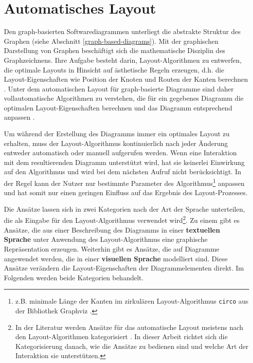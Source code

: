 


\section{Automatisches Layout}
\label{sec:automatic-layout}

Den graph-basierten Softwarediagrammen unterliegt die abstrakte Struktur des Graphen (siehe Abschnitt \ref{graph-based-diagrams}). Mit der graphischen Darstellung von Graphen beschäftigt sich die mathematische Disziplin des Graphzeichnens. Ihre Aufgabe besteht darin, Layout-Algorithmen zu entwerfen, die optimale Layouts in Hinsicht auf ästhetische Regeln erzeugen, d.h. die Layout-Eigenschaften wie Position der Knoten und Routen der Kanten berechnen \cite{Eichelberger05Aesthetics, Arvo02Techniques, Siebenhaller03Automatisches, Maier12A-Pattern-based}. Unter dem automatischen Layout für graph-basierte Diagramme sind daher vollautomatische Algorithmen zu verstehen, die für ein gegebenes Diagramm die optimalen Layout-Eigenschaften berechnen und das Diagramm entsprechend anpassen \cite{Fuhrmann11On-the-Pragmatics}.

Um während der Erstellung des Diagramms immer ein optimales Layout zu erhalten, muss der Layout-Algorithmus kontinuierlich nach jeder Änderung entweder automatisch oder manuell aufgerufen werden. Wenn eine Interaktion mit dem resultierenden Diagramm unterstützt wird, hat sie keinerlei Einwirkung auf den Algorithmus und wird bei dem nächsten Aufruf nicht berücksichtigt. In der Regel kann der Nutzer nur bestimmte Parameter des Algorithmus\footnote{z.B. minimale Länge der Kanten im zirkulären Layout-Algorithmus \lstinline{circo} aus der Bibliothek Graphviz \cite{NorthGansner14Dot-Manual}.} anpassen und hat somit nur einen geringen Einfluss auf das Ergebnis des Layout-Prozesses.

Die Ansätze lassen sich in zwei Kategorien nach der Art der Sprache unterteilen, die als Eingabe für den Layout-Algorithmus verwendet wird\footnote{In der Literatur werden Ansätze für das automatische Layout meistens nach den Layout-Algorithmen kategorisiert \cite[S.39ff]{Fuhrmann11On-the-Pragmatics} \cite[S.32ff]{Eichelberger05Aesthetics}. In dieser Arbeit richtet sich die Kategorisierung danach, wie die Ansätze zu bedienen sind und welche Art der Interaktion sie unterstützen.}. Zu einem gibt es Ansätze, die aus einer Beschreibung des Diagramms in einer \textbf{textuellen Sprache} unter Anwendung des Layout-Algorithmus eine graphische Repräsentation erzeugen. Weiterhin gibt es Ansätze, die auf Diagramme angewendet werden, die in einer \textbf{visuellen Sprache} modelliert sind. Diese Ansätze verändern die Layout-Eigenschaften der Diagrammelementen direkt. Im Folgenden werden beide Kategorien behandelt.

